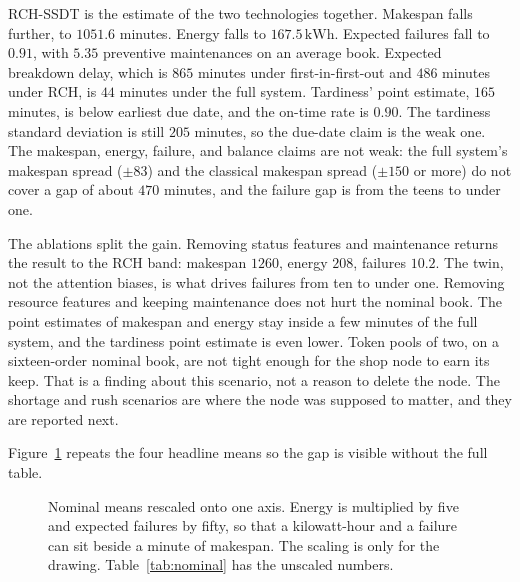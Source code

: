 RCH-SSDT is the estimate of the two technologies together. Makespan falls further, to \(1051.6\) minutes. Energy falls to \(167.5\,\mathrm{kWh}\). Expected failures fall to \(0.91\), with \(5.35\) preventive maintenances on an average book. Expected breakdown delay, which is \(865\) minutes under first-in-first-out and \(486\) minutes under RCH, is \(44\) minutes under the full system. Tardiness' point estimate, \(165\) minutes, is below earliest due date, and the on-time rate is \(0.90\). The tardiness standard deviation is still \(205\) minutes, so the due-date claim is the weak one. The makespan, energy, failure, and balance claims are not weak: the full system's makespan spread (\(\pm 83\)) and the classical makespan spread (\(\pm 150\) or more) do not cover a gap of about \(470\) minutes, and the failure gap is from the teens to under one.

The ablations split the gain. Removing status features and maintenance returns the result to the RCH band: makespan \(1260\), energy \(208\), failures \(10.2\). The twin, not the attention biases, is what drives failures from ten to under one. Removing resource features and keeping maintenance does not hurt the nominal book. The point estimates of makespan and energy stay inside a few minutes of the full system, and the tardiness point estimate is even lower. Token pools of two, on a sixteen-order nominal book, are not tight enough for the shop node to earn its keep. That is a finding about this scenario, not a reason to delete the node. The shortage and rush scenarios are where the node was supposed to matter, and they are reported next.

Figure~\ref{fig:bars} repeats the four headline means so the gap is visible without the full table.

\begin{figure}[ht]
\centering
{}
\caption{Nominal means rescaled onto one axis. Energy is multiplied by five and expected failures by fifty, so that a kilowatt-hour and a failure can sit beside a minute of makespan. The scaling is only for the drawing. Table~\ref{tab:nominal} has the unscaled numbers.}
\label{fig:bars}
\end{figure}

